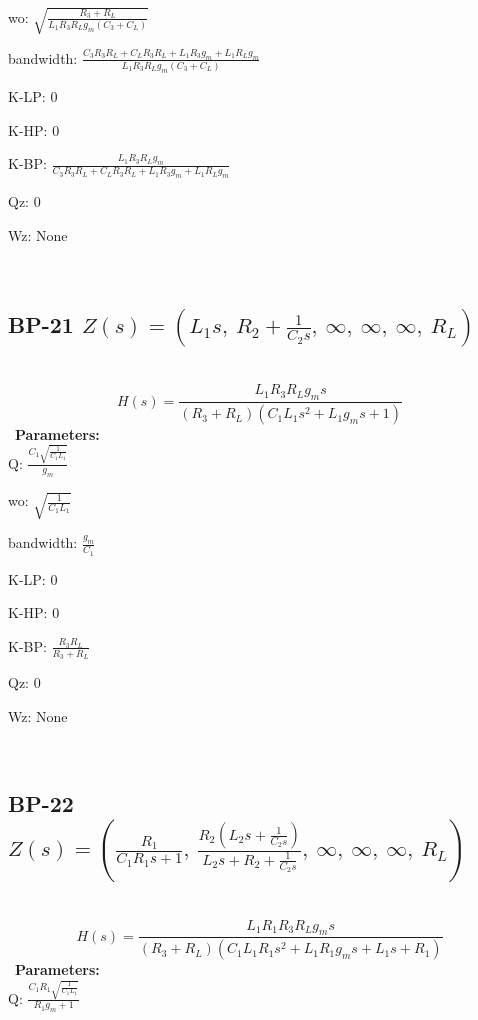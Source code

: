 \documentclass{article}
\begin{document}
wo: $\sqrt{\frac{R_{3} + R_{L}}{L_{1} R_{3} R_{L} g_{m} \left(C_{3} + C_{L}\right)}}$\ 

bandwidth: $\frac{C_{3} R_{3} R_{L} + C_{L} R_{3} R_{L} + L_{1} R_{3} g_{m} + L_{1} R_{L} g_{m}}{L_{1} R_{3} R_{L} g_{m} \left(C_{3} + C_{L}\right)}$\ 

K-LP: $0$\ 

K-HP: $0$\ 

K-BP: $\frac{L_{1} R_{3} R_{L} g_{m}}{C_{3} R_{3} R_{L} + C_{L} R_{3} R_{L} + L_{1} R_{3} g_{m} + L_{1} R_{L} g_{m}}$\ 

Qz: $0$\ 

Wz: $\text{None}$\ 

\ 

\subsection{BP-21 $Z(s) = \left( L_{1} s, \  R_{2} + \frac{1}{C_{2} s}, \  \infty, \  \infty, \  \infty, \  R_{L}\right)$ } \ 
\textbf{\[H(s) = \frac{L_{1} R_{3} R_{L} g_{m} s}{\left(R_{3} + R_{L}\right) \left(C_{1} L_{1} s^{2} + L_{1} g_{m} s + 1\right)}\] } \ 
\textbf{Parameters:}\\ 

Q: $\frac{C_{1} \sqrt{\frac{1}{C_{1} L_{1}}}}{g_{m}}$\ 

wo: $\sqrt{\frac{1}{C_{1} L_{1}}}$\ 

bandwidth: $\frac{g_{m}}{C_{1}}$\ 

K-LP: $0$\ 

K-HP: $0$\ 

K-BP: $\frac{R_{3} R_{L}}{R_{3} + R_{L}}$\ 

Qz: $0$\ 

Wz: $\text{None}$\ 

\ 

\subsection{BP-22 $Z(s) = \left( \frac{R_{1}}{C_{1} R_{1} s + 1}, \  \frac{R_{2} \left(L_{2} s + \frac{1}{C_{2} s}\right)}{L_{2} s + R_{2} + \frac{1}{C_{2} s}}, \  \infty, \  \infty, \  \infty, \  R_{L}\right)$ } \ 
\textbf{\[H(s) = \frac{L_{1} R_{1} R_{3} R_{L} g_{m} s}{\left(R_{3} + R_{L}\right) \left(C_{1} L_{1} R_{1} s^{2} + L_{1} R_{1} g_{m} s + L_{1} s + R_{1}\right)}\] } \ 
\textbf{Parameters:}\\ 

Q: $\frac{C_{1} R_{1} \sqrt{\frac{1}{C_{1} L_{1}}}}{R_{1} g_{m} + 1}$\ 
\end{document}
